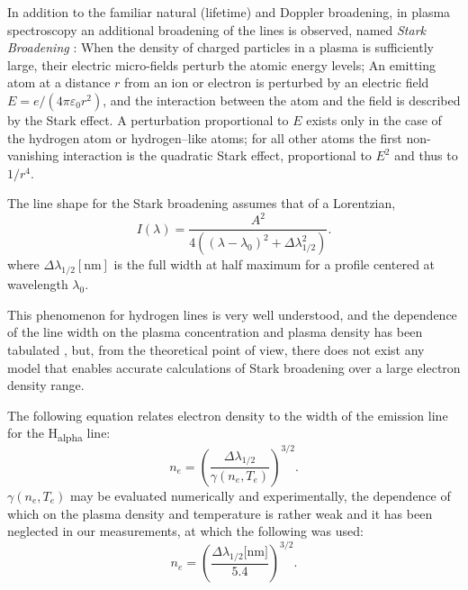 \documentclass[justified,nofonts,nobib,openany]{tufte-book}
\begin{document}
In addition to the familiar natural (lifetime) and Doppler broadening, in plasma spectroscopy an additional broadening of the lines is observed, named \textit{Stark Broadening} : When the density of charged particles in a plasma is sufficiently large, their electric micro-fields perturb the atomic energy levels\cite{Griem1974SpectralPlasmas.}; An emitting atom at a distance $r$ from an ion or electron is perturbed by an electric field $E=e/(4\pi \varepsilon_0 r^2)$, and the interaction between the atom and the field is described by the Stark effect. A perturbation proportional to $E$ exists only in the case of the hydrogen atom or hydrogen--like atoms; for all other atoms the first non-vanishing interaction is the quadratic Stark effect\cite{Thorne1988Spectrophysics}, proportional to $E^2$ and thus to $1/r^4$.


The line shape for the Stark broadening assumes that of a Lorentzian,
\begin{equation}
I\left( \lambda \right)=\frac{A^2}{4\left( \left(\lambda-\lambda_0\right)^2+\Delta \lambda_{1/2}^2\right)}. \label{eq:Stark_Broadening}
\end{equation}
where $\Delta \lambda_{1/2}\left[\si{\nm}\right]$ is the full width at half maximum for a profile centered at wavelength $\lambda_0$.

This phenomenon for hydrogen lines is very well understood, and the dependence of the line width on the plasma concentration and plasma density has been tabulated \cite{Griem1964PlasmaSpectroscopy,Griem1974SpectralPlasmas.}, but, from the theoretical point of view, there does not exist any model that enables accurate calculations of Stark broadening over a large electron density range\cite{Griem2000StarkPlasmas}. 

The following equation relates electron density to the width of the emission line for the H\textsubscript{alpha} line:
\begin{equation}
n_e=\left( \frac{\Delta\lambda_{1/2}}{\gamma\left(n_e,T_e\right)}\right)^{3/2}.
\end{equation}
$\gamma\left(n_e,T_e\right)$ may be evaluated numerically and experimentally\cite{Griem2005ComparisonResults}, the dependence of which on the plasma density and temperature is rather weak and it has been neglected in our measurements, at which the following was used:
\begin{equation}
n_e=\left( \frac{\Delta\lambda_{1/2}\text{[nm]}}{5.4}\right)^{3/2}. \label{eq:delta_lambda}
\end{equation}
\end{document}
